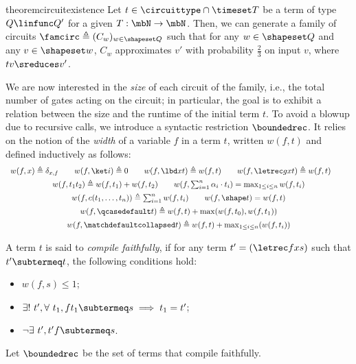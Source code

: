 \begin{restatable}{theorem}{circuitexistence}
  \label{thm:circuit-exist}
  Let $t \in \circuittype \cap \timeset T$ be a term of type $Q \linfunc Q'$
  for a given $T : \mbN \to \mbN$. 
  Then, we can generate a family of circuits $\famcirc \triangleq (C_w)_{w \in
  \shapeset Q}$ such that for any $w \in \shapeset Q$ and any $v \in \shapeset
  w$, $C_w$ approximates $v'$ with probability $\frac 2 3$ on input $v$, where
  $tv \sreduces v'$.
\end{restatable}

We are now interested in the \emph{size} of each circuit of the family, i.e.,
the total number of gates acting on the circuit; in particular, the goal is to
exhibit a relation between the size and the runtime of the initial term $t$. To
avoid a blowup due to recursive calls, we introduce a syntactic restriction
$\boundedrec$. It relies on the notion of the \emph{width} of a variable $f$ in
a term $t$, written $w(f, t)$ and defined inductively as follows:
\[
\begin{array}{c}
  w(f, x) \triangleq \delta_{x, f} 
  \qquad 
  w(f, \ket i) \triangleq 0 
  \qquad 
  w(f, \lbd x t) \triangleq w(f,t) \qquad
  w(f, \letrec g x t) \triangleq w(f, t) \qquad \\[1ex]
  w(f, t_1 t_2) \triangleq w(f, t_1) + w(f, t_2)
  \qquad 
  w(f, \sum_{i=1}^n \alpha_i \cdot t_i) = \max_{1 \leq i \leq n} w(f, t_i) \\[1ex]
  w(f, c(t_1, \dots, t_n))       \triangleq \sum_{i=1}^n w(f, t_i) 
  \qquad
  w(f, \shape t) = w(f, t) \\[1ex]
  w(f,\qcasedefault t) \triangleq w(f, t) + \max(w(f,t_0), w(f,t_1)) \\[1ex]
  w(f, \matchdefaultcollapsed t) \triangleq w(f, t) + \max_{1 \leq i \leq
  n} (w(f, t_i))
\end{array}
\]

\begin{definition}\label{def:brec}
  A term $t$ is said to \emph{compile faithfully}, if for any term $t'=(\letrec
  f x s)$ such that $t' \subtermeq t$, the following conditions hold:
  \begin{itemize}
    \item $w(f, s) \leq 1$;
    \item $\exists !\  t', \forall\ t_1, f t_1 \subtermeq s \implies t_1 = t'$;
    \item $\neg \exists\  t', t'f \subtermeq s$.
  \end{itemize}
  Let $\boundedrec$ be the set of terms that compile faithfully.
\end{definition}

